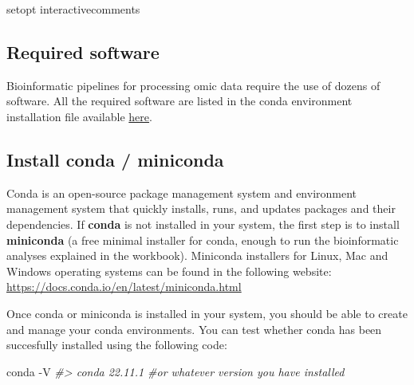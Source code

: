 \documentclass[
]{book}
\newenvironment{Shaded}{\begin{snugshade}}{\end{snugshade}}
\newcommand{\AttributeTok}[1]{\textcolor[rgb]{0.77,0.63,0.00}{#1}}
\newcommand{\CommentTok}[1]{\textcolor[rgb]{0.56,0.35,0.01}{\textit{#1}}}
\newcommand{\ExtensionTok}[1]{#1}
\newcommand{\NormalTok}[1]{#1}
\begin{document}
\small

\begin{Shaded}
\begin{Highlighting}[]
\ExtensionTok{setopt}\NormalTok{ interactivecomments}
\end{Highlighting}
\end{Shaded}

\normalsize

\hypertarget{required-software}{%
\subsection*{Required software}\label{required-software}}

Bioinformatic pipelines for processing omic data require the use of dozens of software. All the required software are listed in the conda environment installation file available \href{https://raw.githubusercontent.com/holo-omics/holo-omics.github.io/main/bin/holo-omics-env.yaml}{here}.

\hypertarget{install-conda-miniconda}{%
\subsection*{Install conda / miniconda}\label{install-conda-miniconda}}

Conda is an open-source package management system and environment management system that quickly installs, runs, and updates packages and their dependencies. If \textbf{conda} is not installed in your system, the first step is to install \textbf{miniconda} (a free minimal installer for conda, enough to run the bioinformatic analyses explained in the workbook). Miniconda installers for Linux, Mac and Windows operating systems can be found in the following website:
\url{https://docs.conda.io/en/latest/miniconda.html}

Once conda or miniconda is installed in your system, you should be able to create and manage your conda environments. You can test whether conda has been succesfully installed using the following code:

\small

\begin{Shaded}
\begin{Highlighting}[]
\ExtensionTok{conda} \AttributeTok{{-}V}
\CommentTok{\#\textgreater{} conda 22.11.1 \#or whatever version you have installed}
\end{Highlighting}
\end{Shaded}
\end{document}
